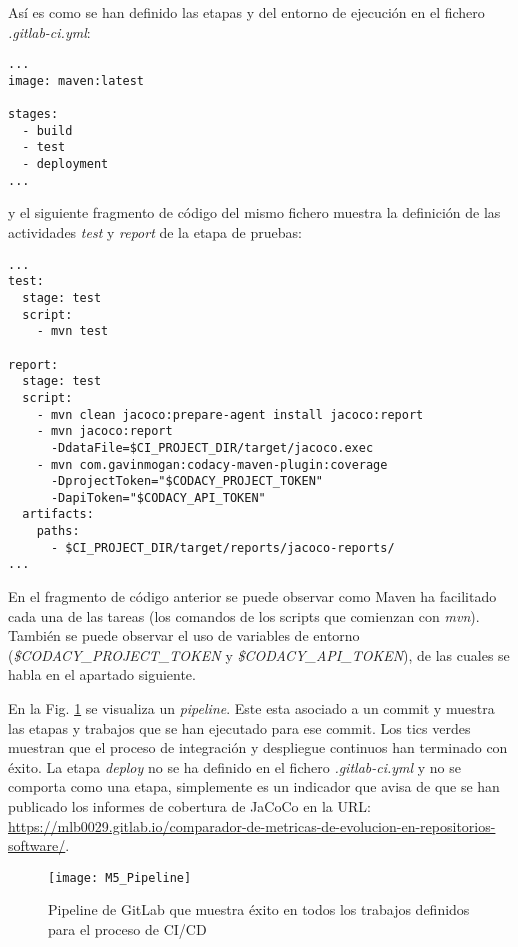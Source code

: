 Así es como se han definido las etapas y del entorno de ejecución en el fichero \textit{.gitlab-ci.yml}:\\
\begin{minipage}{\linewidth}
{\tiny
\begin{lstlisting}[breaklines]
...
image: maven:latest

stages:
  - build
  - test
  - deployment
...
\end{lstlisting}
}
\end{minipage}
y el siguiente fragmento de código del mismo fichero muestra la definición de las actividades \textit{test} y \textit{report} de la etapa de pruebas:\\
\begin{minipage}{\linewidth}
{\tiny
\begin{lstlisting}[breaklines]
...
test:
  stage: test
  script:
	- mvn test

report:
  stage: test
  script:
	- mvn clean jacoco:prepare-agent install jacoco:report
	- mvn jacoco:report 
	  -DdataFile=$CI_PROJECT_DIR/target/jacoco.exec
	- mvn com.gavinmogan:codacy-maven-plugin:coverage 
	  -DprojectToken="$CODACY_PROJECT_TOKEN" 
	  -DapiToken="$CODACY_API_TOKEN"
  artifacts:
	paths:
	  - $CI_PROJECT_DIR/target/reports/jacoco-reports/
...		
\end{lstlisting}
}
\end{minipage}

En el fragmento de código anterior se puede observar como Maven ha facilitado cada una de las tareas (los comandos de los scripts que comienzan con \textit{mvn}). También se puede observar el uso de variables de entorno (\textit{\$CODACY\_PROJECT\_TOKEN} y \textit{\$CODACY\_API\_TOKEN}), de las cuales se habla en el apartado siguiente.

 En la Fig. \ref{fig:M5_Pipeline} se visualiza un \textit{pipeline}. Este esta asociado a un commit y muestra las etapas y trabajos que se han ejecutado para ese commit. Los tics verdes muestran que el proceso de integración y despliegue continuos han terminado con éxito. La etapa \textit{deploy} no se ha definido en el fichero \textit{.gitlab-ci.yml} y no se comporta como una etapa, simplemente es un indicador que avisa de que se han publicado los informes de cobertura de JaCoCo en la URL: \url{https://mlb0029.gitlab.io/comparador-de-metricas-de-evolucion-en-repositorios-software/}.
 
 \begin{figure}[!h]
 	\centering
 	\texttt{[image: M5\_Pipeline]}
 	\caption{Pipeline de GitLab que muestra éxito en todos los trabajos definidos para el proceso de CI/CD}\label{fig:M5_Pipeline}
 \end{figure}
 \FloatBarrier
 
